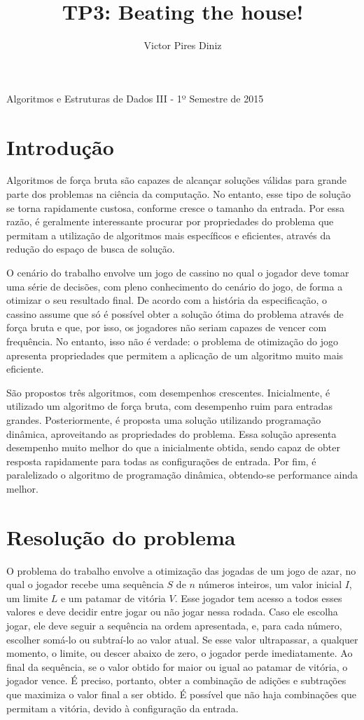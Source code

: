 \documentclass[10pt,a4paper]{article}
\title{TP3: Beating the house!}
\author{Victor Pires Diniz}
\numberwithin{equation}{section}
\begin{document}
\maketitle
\begin{center}
Algoritmos e Estruturas de Dados III - 1º Semestre de 2015
\end{center}

\section{Introdução}

Algoritmos de força bruta são capazes de alcançar soluções válidas para grande parte dos problemas na ciência da computação. No entanto, esse tipo de solução se torna rapidamente custosa, conforme cresce o tamanho da entrada. Por essa razão, é geralmente interessante procurar por propriedades do problema que permitam a utilização de algoritmos mais específicos e eficientes, através da redução do espaço de busca de solução.

O cenário do trabalho envolve um jogo de cassino no qual o jogador deve tomar uma série de decisões, com pleno conhecimento do cenário do jogo, de forma a otimizar o seu resultado final. De acordo com a história da especificação, o cassino assume que só é possível obter a solução ótima do problema através de força bruta e que, por isso, os jogadores não seriam capazes de vencer com frequência. No entanto, isso não é verdade: o problema de otimização do jogo apresenta propriedades que permitem a aplicação de um algoritmo muito mais eficiente.

São propostos três algoritmos, com desempenhos crescentes. Inicialmente, é utilizado um algoritmo de força bruta, com desempenho ruim para entradas grandes. Posteriormente, é proposta uma solução utilizando programação dinâmica, aproveitando as propriedades do problema. Essa solução apresenta desempenho muito melhor do que a inicialmente obtida, sendo capaz de obter resposta rapidamente para todas as configurações de entrada. Por fim, é paralelizado o algoritmo de programação dinâmica, obtendo-se performance ainda melhor.

\section{Resolução do problema}

O problema do trabalho envolve a otimização das jogadas de um jogo de azar, no qual o jogador recebe uma sequência $S$ de $n$ números inteiros, um valor inicial $I$, um limite $L$ e um patamar de vitória $V$. Esse jogador tem acesso a todos esses valores e deve decidir entre jogar ou não jogar nessa rodada. Caso ele escolha jogar, ele deve seguir a sequência na ordem apresentada, e, para cada número, escolher somá-lo ou subtraí-lo ao valor atual. Se esse valor ultrapassar, a qualquer momento, o limite, ou descer abaixo de zero, o jogador perde imediatamente. Ao final da sequência, se o valor obtido for maior ou igual ao patamar de vitória, o jogador vence. É preciso, portanto, obter a combinação de adições e subtrações que maximiza o valor final a ser obtido. É possível que não haja combinações que permitam a vitória, devido à configuração da entrada.
\end{document}
